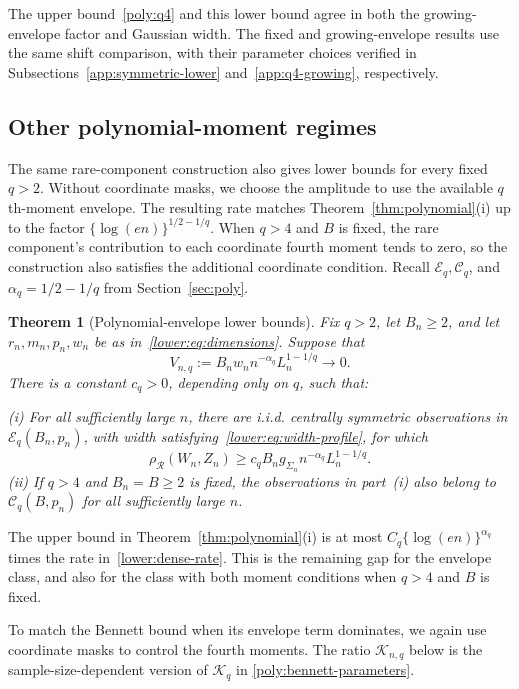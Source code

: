 \documentclass[11pt,letterpaper,twoside,leqno]{article}
\theoremstyle{bookplain}
\newtheorem{theorem}{Theorem}
\theoremstyle{bookremark}
\newcommand{\rh}{\rho_{\mathcal R}}
\begin{document}
The upper bound~\eqref{poly:q4} and this lower bound agree in both
the growing-envelope factor and Gaussian width. The fixed and
growing-envelope results use the same shift comparison, with their
parameter choices verified in Subsections~\ref{app:symmetric-lower}
and~\ref{app:q4-growing}, respectively.

\subsection{Other polynomial-moment regimes}

The same rare-component construction also gives lower bounds for
every fixed $q>2$. Without coordinate masks, we choose the amplitude
to use the available $q$th-moment envelope. The resulting rate matches
Theorem~\ref{thm:polynomial}\textup{(i)} up to the factor
$\{\log(en)\}^{1/2-1/q}$.
When $q>4$ and $B$ is fixed, the rare component's contribution to
each coordinate fourth moment tends to zero, so the construction
also satisfies the additional coordinate condition.
Recall $\mathcal E_q,\mathcal C_q$, and $\alpha_q=1/2-1/q$
from Section~\ref{sec:poly}.

\begin{theorem}[Polynomial-envelope lower bounds]\label{lower:dense}
Fix \(q>2\), let \(B_n\ge2\), and let
\(r_n,m_n,p_n,w_n\) be as in~\eqref{lower:eq:dimensions}.
Suppose that
\[
 V_{n,q}:=B_n w_n n^{-\alpha_q}L_n^{1-1/q}\longrightarrow0.
\]
There is a constant \(c_q>0\), depending only on \(q\), such that:

\noindent\textup{(i)} For all sufficiently large \(n\), there are
i.i.d. centrally symmetric observations in \(\mathcal E_q(B_n,p_n)\),
with width satisfying~\eqref{lower:eq:width-profile}, for which
\begin{equation}
 \rh(W_n,Z_n)\ge c_q B_n g_{\Sigma_n}n^{-\alpha_q}L_n^{1-1/q}.
 \label{lower:dense-rate}
\end{equation}
\noindent\textup{(ii)} If \(q>4\) and \(B_n=B\ge2\) is fixed,
the observations in part~\textup{(i)} also belong to
\(\mathcal C_q(B,p_n)\) for all sufficiently large \(n\).
\end{theorem}

The upper bound in Theorem~\ref{thm:polynomial}\textup{(i)} is at
most $C_q\{\log(en)\}^{\alpha_q}$ times the rate
in~\eqref{lower:dense-rate}. This is the remaining gap for the
envelope class, and also for the class with both moment conditions
when $q>4$ and $B$ is fixed.

To match the Bennett bound when its envelope term dominates, we
again use coordinate masks to control the fourth moments. The
ratio $\mathcal K_{n,q}$ below is the sample-size-dependent version
of $\mathcal K_q$ in \eqref{poly:bennett-parameters}.
\end{document}

